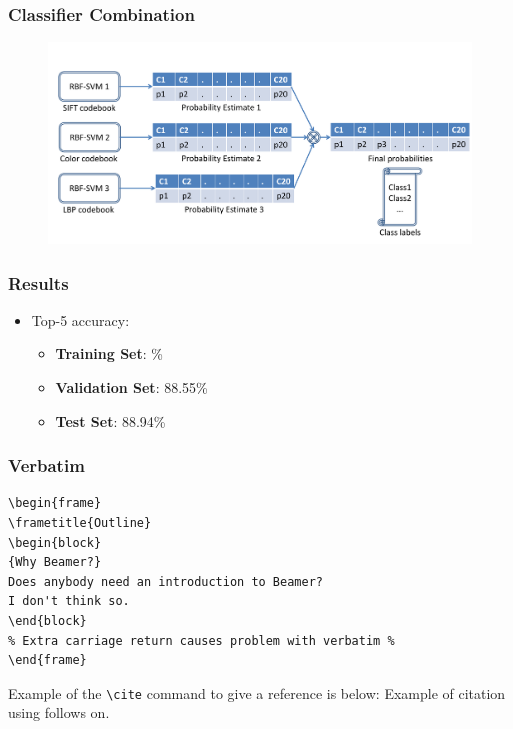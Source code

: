 \documentclass{beamer}
\begin{document}
\begin{frame}
\frametitle{Classifier Combination}
\begin{figure}
\includegraphics[width = 1\textwidth]{classifiercombination}
\end{figure}
\end{frame}

\begin{frame}
\frametitle{Results}
\begin{itemize}
\item Top-5 accuracy:
\begin{itemize}
\item \textbf{Training Set}: \%
\item \textbf{Validation Set}: 88.55\%
\item \textbf{Test Set}: 88.94\%
\end{itemize}
\end{itemize}
\end{frame}

\begin{frame}[fragile] %
\frametitle{Verbatim}
\begin{example}
\begin{verbatim}
\begin{frame}
\frametitle{Outline}
\begin{block}
{Why Beamer?}
Does anybody need an introduction to Beamer?
I don't think so.
\end{block}
% Extra carriage return causes problem with verbatim %
\end{frame}\end{verbatim} 
\end{example}
\end{frame}
 
\begin{frame}[fragile]  %
Example of the \verb|\cite| command to give a reference is below:
Example of citation using \cite{key1} follows on.
\end{frame}
 
\end{document}

